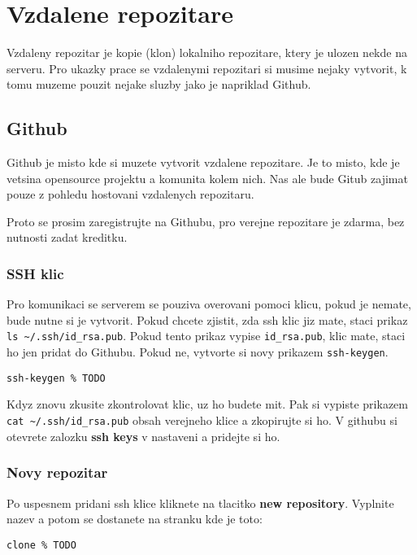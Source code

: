 \section{Vzdalene repozitare}

Vzdaleny repozitar je kopie (klon) lokalniho repozitare, ktery je ulozen nekde na serveru. Pro ukazky prace se vzdalenymi repozitari si musime nejaky vytvorit, k tomu muzeme pouzit nejake sluzby jako je napriklad Github.

\subsection{Github}

Github je misto kde si muzete vytvorit vzdalene repozitare. Je to misto, kde je vetsina opensource projektu a komunita kolem nich. Nas ale bude Gitub zajimat pouze z pohledu hostovani vzdalenych repozitaru.

Proto se prosim zaregistrujte na Githubu, pro verejne repozitare je zdarma, bez nutnosti zadat kreditku.

\subsubsection{SSH klic}

Pro komunikaci se serverem se pouziva overovani pomoci klicu, pokud je nemate, bude nutne si je vytvorit. Pokud chcete zjistit, zda ssh klic jiz mate, staci prikaz \lstinline|ls ~/.ssh/id_rsa.pub|. Pokud tento prikaz vypise \lstinline|id_rsa.pub|, klic mate, staci ho jen pridat do Githubu. Pokud ne, vytvorte si novy prikazem \lstinline|ssh-keygen|.

\begin{lstlisting}
ssh-keygen % TODO
\end{lstlisting}

Kdyz znovu zkusite zkontrolovat klic, uz ho budete mit. Pak si vypiste prikazem \lstinline|cat ~/.ssh/id_rsa.pub| obsah verejneho klice a zkopirujte si ho. V githubu si otevrete zalozku {\bf ssh keys} v nastaveni a pridejte si ho.

\subsubsection{Novy repozitar}

Po uspesnem pridani ssh klice kliknete na tlacitko {\bf new repository}. Vyplnite nazev a potom se dostanete na stranku kde je toto:


\begin{lstlisting}
clone % TODO
\end{lstlisting}

